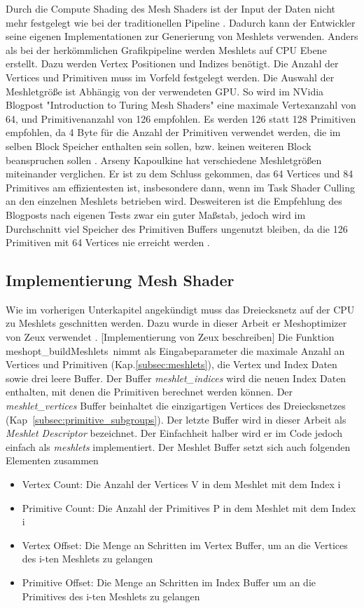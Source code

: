 Durch die Compute Shading  des Mesh Shaders ist der Input der Daten nicht mehr festgelegt wie bei der traditionellen Pipeline .
Dadurch kann der Entwickler seine eigenen Implementationen zur Generierung von Meshlets verwenden.
Anders als bei der herkömmlichen Grafikpipeline werden Meshlets auf CPU Ebene erstellt.
Dazu werden Vertex Positionen und Indizes benötigt.
Die Anzahl der Vertices und Primitiven muss im Vorfeld festgelegt werden.
Die Auswahl der Meshletgröße ist Abhängig von der verwendeten GPU.
So wird im NVidia Blogpost "Introduction to Turing Mesh Shaders" eine maximale Vertexanzahl von 64, und Primitivenanzahl von 126 empfohlen. 
Es werden 126 statt 128 Primitiven empfohlen, da 4 Byte für die Anzahl der Primitiven verwendet werden, die im selben Block Speicher enthalten sein sollen, bzw. keinen weiteren Block beanspruchen sollen \cite{Kubisch2018}.
Arseny Kapoulkine hat verschiedene Meshletgrößen miteinander verglichen.
Er ist zu dem Schluss gekommen, das 64 Vertices und 84 Primitives am effizientesten ist, insbesondere dann, wenn im Task Shader Culling an den einzelnen Meshlets betrieben wird.
Desweiteren ist die Empfehlung des Blogposts nach eigenen Tests zwar ein guter Maßstab, jedoch wird im Durchschnitt viel Speicher des Primitiven Buffers ungenutzt bleiben, da die 126 Primitiven mit 64 Vertices nie erreicht werden \cite{Kapoulkine2023}.

\subsection{Implementierung Mesh Shader}
\label{subsec:meshshaderimpl}
Wie im vorherigen Unterkapitel angekündigt muss das Dreiecksnetz auf der CPU zu Meshlets geschnitten werden. 
Dazu wurde in dieser Arbeit er Meshoptimizer von Zeux verwendet \cite{Zeux}. 
[Implementierung von Zeux beschreiben]
Die Funktion \glqq meshopt\_buildMeshlets\grqq\ nimmt als Eingabeparameter die maximale Anzahl an Vertices und Primitiven (Kap.\ref{subsec:meshlets}), die Vertex und Index Daten sowie drei leere Buffer.
Der Buffer \textit{meshlet\_indices} wird die neuen Index Daten enthalten, mit denen die Primitiven berechnet werden können.
Der \textit{meshlet\_vertices} Buffer beinhaltet die einzigartigen Vertices des Dreiecksnetzes (Kap~\ref{subsec:primitive_subgroups}).
Der letzte Buffer wird in dieser Arbeit als \textit{Meshlet Descriptor} bezeichnet.
Der Einfachheit halber wird er im Code jedoch einfach als \textit{meshlets} implementiert.
Der Meshlet Buffer setzt sich auch folgenden Elementen zusammen
\begin{itemize}
\item Vertex Count: Die Anzahl der Vertices V in dem Meshlet mit dem Index i
\item Primitive Count: Die Anzahl der Primitives P in dem Meshlet mit dem Index i
\item Vertex Offset: Die Menge an Schritten im Vertex Buffer, um an die Vertices des i-ten Meshlets zu gelangen
\item Primitive Offset: Die Menge an Schritten im Index Buffer um an die Primitives des i-ten Meshlets zu gelangen
\end{itemize}

